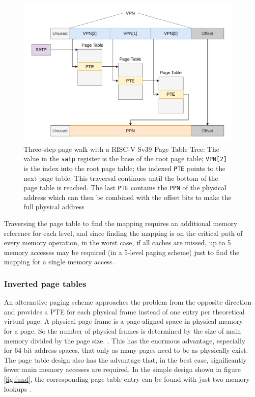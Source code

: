 \begin{figure}[t]
    \centering
    \includegraphics[scale=.8]{figures/VM-Tree.pdf}
    \caption[RISC-V Sv39 3-Level Page Tree]{Three-step page walk with a RISC-V Sv39 Page Table Tree:
        The value in the \texttt{satp} register is the base of the root page table; \texttt{VPN[2]}
        is the index into the root page table; the indexed \texttt{PTE} points to the next page table.
        This traversal continues until the bottom of the page table is reached. The last \texttt{PTE}
        contains the \texttt{PPN} of the physical address which can then be combined with the offset
        bits to make the full physical address}
    \label{fig:fund:pagetree}
\end{figure}


Traversing the page table to find the mapping requires an additional memory reference for each
level, and since finding the mapping is on the critical path of every memory operation,
in the worst case, if all caches are missed, up to 5 memory accesses may be required (in a 5-level paging
scheme) just to find the mapping for a single memory access.

\subsubsection{Inverted page tables}
An alternative paging scheme approaches the problem from the opposite direction and provides a PTE
for each physical frame instead of one entry per theoretical virtual page.
A physical page frame is a page-aligned space in physical memory for a page.
So the number of physical frames is determined by the size of main memory divided by the page size.
.
This has the enormous advantage, especially for 64-bit address spaces, that only as many pages need to be
as physically exist.
The page table design also has the advantage that, in the best case, significantly fewer main memory
accesses are required. In the simple design shown in figure \ref{fig:fund}, the corresponding
page table entry can be found with just two memory lookups \cite{skarlatos2020elastic}.

